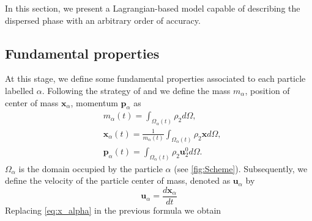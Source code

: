
In this section, we present a Lagrangian-based model capable of describing the dispersed phase with an arbitrary order of accuracy.

\subsection{Fundamental properties}
At this stage, we define some fundamental properties associated to each particle labelled $\alpha$.
Following the strategy of \citet{lhuillier2009rheology,lhuillier1992volume,zaepffel2011modelisation} and \citet[Chapter 2]{morel2015mathematical}
we define the mass $m_\alpha$, position of center of mass $\mathbf{x}_\alpha$, momentum $\textbf{p}_\alpha$ as %
\begin{align}
    &m_\alpha(t)
    = \int_{\Omega_\alpha(t)} \rho_2  d\Omega, \\
    &\textbf{x}_\alpha(t)
    = \frac{1}{m_\alpha(t) }\int_{\Omega_\alpha(t)} \rho_2 \textbf{x} d\Omega, \label{eq:x_alpha}\\
    &\textbf{p}_\alpha(t) 
    = \int_{\Omega_\alpha(t)} \rho_2 \textbf{u}_2^0 d\Omega.
\end{align}
 $\Omega_\alpha$ is the domain occupied by the particle $\alpha$ (see \ref{fig:Scheme}). 
Subsequently, we define the velocity of the particle center of mass, denoted as $\textbf{u}_\alpha$ by 
\begin{equation}
\textbf{u}_\alpha = \frac{d \textbf{x}_\alpha}{dt}  
\end{equation}
Replacing \eqref{eq:x_alpha} in the previous formula we obtain


